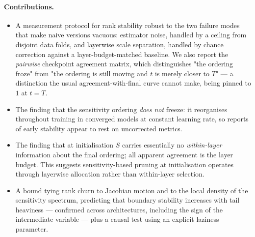 \documentclass{article}
\begin{document}
\paragraph{Contributions.}
\begin{itemize}
\item A measurement protocol for rank stability robust to the two failure modes that make
      naive versions vacuous: estimator noise, handled by a ceiling from disjoint data
      folds, and layerwise scale separation, handled by chance correction against a
      layer-budget-matched baseline. We also report the \emph{pairwise} checkpoint
      agreement matrix, which distinguishes "the ordering froze" from "the ordering is
      still moving and $t$ is merely closer to $T$" --- a distinction the usual
      agreement-with-final curve cannot make, being pinned to $1$ at $t=T$. %
\item The finding that the sensitivity ordering \emph{does not} freeze: it reorganises
      throughout training in converged models at constant learning rate, so reports of
      early stability appear to rest on uncorrected metrics. %
\item The finding that at initialisation $S$ carries essentially no \emph{within-layer}
      information about the final ordering; all apparent agreement is the layer budget.
      This suggests sensitivity-based pruning at initialisation operates through layerwise
      allocation rather than within-layer selection. %
\item A bound tying rank churn to Jacobian motion and to the local density of the
      sensitivity spectrum, predicting that boundary stability increases with tail
      heaviness --- confirmed across architectures, including the sign of the intermediate
      variable --- plus a causal test using an explicit laziness parameter. %
\end{itemize}
\end{document}
